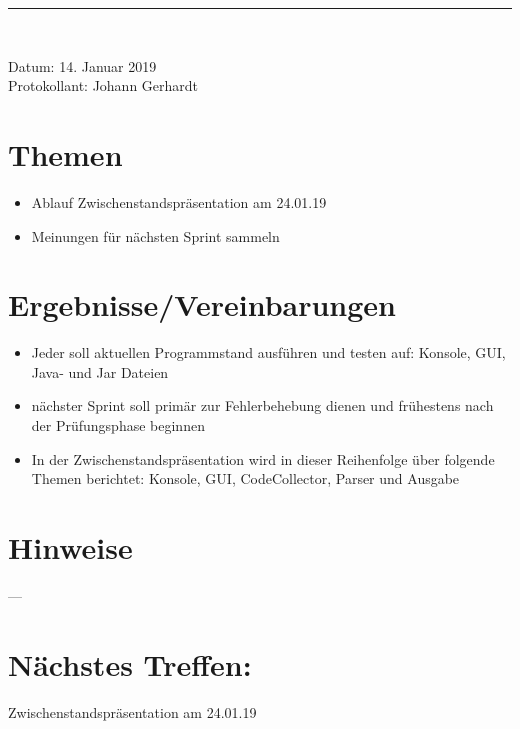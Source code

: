 \begin{center}  
\vspace{0.5pt}\nointerlineskip\rule{\textwidth}{0.2pt}\\ 
\vspace{0.5pt}\nointerlineskip
\end{center} 
\large Datum: 14. Januar 2019\vspace{3pt}\\\large Protokollant: 
Johann Gerhardt
\section*{Themen}
\begin{itemize}
\item Ablauf Zwischenstandspräsentation am 24.01.19
\item Meinungen für nächsten Sprint sammeln
\end{itemize}
\section*{Ergebnisse/Vereinbarungen}
\begin{itemize}
	\item Jeder soll aktuellen Programmstand ausführen und testen auf: Konsole, GUI, Java- und Jar Dateien
	\item nächster Sprint soll primär zur Fehlerbehebung dienen und frühestens nach der Prüfungsphase beginnen
	\item In der Zwischenstandspräsentation wird in dieser Reihenfolge über folgende Themen berichtet: Konsole, GUI, CodeCollector, Parser und Ausgabe
\end{itemize}
\section*{Hinweise}
---
\section*{Nächstes Treffen:}
Zwischenstandspräsentation am 24.01.19